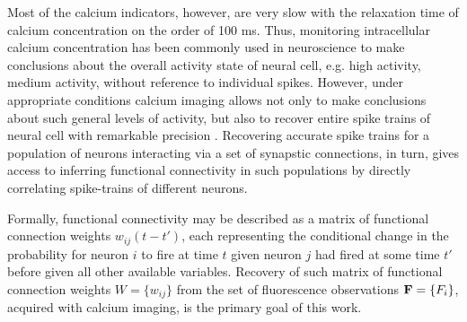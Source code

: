 \documentclass[amsmath,amssymb]{revtex4}
\begin{document}
Most of the calcium indicators, however, are very slow with the relaxation time of calcium concentration on the order of 100 ms. Thus, monitoring intracellular calcium concentration has been commonly used in neuroscience to make conclusions about the overall activity state of neural cell, e.g. high activity, medium activity, without reference to individual spikes.
However, under appropriate conditions  calcium imaging allows not only to make conclusions about such general levels of activity, but also to recover entire spike trains of neural cell with remarkable precision \cite{Vogelstein2009}.
Recovering accurate spike trains for a population of neurons interacting via a set of synapstic connections, in turn, gives access to inferring functional connectivity in such populations by directly correlating spike-trains of different neurons.

Formally, functional connectivity may be described as a matrix of functional connection weights $w_{ij}(t-t')$, each representing the conditional change in the probability for neuron $i$ to fire at time $t$ given neuron $j$ had fired at some time $t'$ before given all other available variables.
Recovery of such matrix of functional connection weights $W=\{w_{ij}\}$ from the set of fluorescence observations ${\bf F}=\{F_i\}$, acquired with calcium imaging, is the primary goal of this work.
\end{document}

